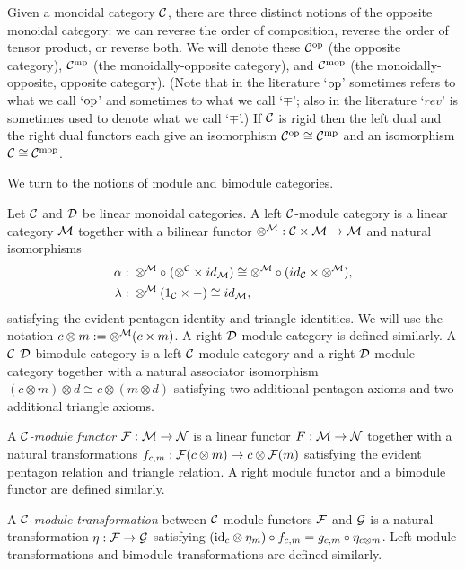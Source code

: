 \documentclass{amsart}
\begin{document}
Given a monoidal category $\mathcal C$, there are three distinct notions of the opposite monoidal category: we can reverse the order of composition, reverse the order of tensor product, or reverse both.  We will denote these $\mathcal C^{\mathrm{op}}$ (the opposite category), $\mathcal C^{\mathrm{mp}}$ (the monoidally-opposite category), and $\mathcal C^{\mathrm{mop}}$ (the monoidally-opposite, opposite category).  (Note that in the literature `$\mathrm{op}$' sometimes refers to what we call `$\mathrm{op}$' and sometimes to what we call `$\mp$'; also in the literature `$rev$' is sometimes used to denote what we call `$\mp$'.)  If $\mathcal C$ is rigid then the left dual and the right dual functors each give an isomorphism $\mathcal C^{\mathrm{op}} \cong \mathcal C^{\mathrm{mp}}$ and an isomorphism $\mathcal C \cong \mathcal C^{\mathrm{mop}}$.  

We turn to the notions of module and bimodule categories.

\begin{definition}
Let $\mathcal C$ and $\mathcal D$ be linear monoidal categories.
A left $\mathcal C$-module category is a linear category $\mathcal M$ together with a bilinear functor $\otimes^{\mathcal M}: \mathcal C \times \mathcal M \to \mathcal M$ and natural isomorphisms
	\begin{align*}
		\alpha: & \;    \otimes^{\mathcal M} \circ \; (\otimes^{\mathcal C} \times id_{\mathcal M}) \cong  \otimes^{\mathcal M} \circ (id_{\mathcal C} \times \otimes^{\mathcal M}), \\
		\lambda: & \; \otimes^{\mathcal M} (1_{\mathcal C} \times -) \cong id_{\mathcal M},
	\end{align*}
	satisfying the evident pentagon identity and triangle identities.  We will use the notation $c \otimes m := \otimes^\mathcal M(c \times m)$.  A right $\mathcal D$-module category is defined similarly.
	A $\mathcal C$-$\mathcal D$ bimodule category is a left $\mathcal C$-module category and a right $\mathcal D$-module category together with a natural associator isomorphism $(c \otimes m) \otimes d \cong c \otimes (m \otimes d)$ satisfying two additional pentagon axioms and two additional triangle axioms.
\end{definition}

\begin{definition}		
A {\em $\mathcal C$-module functor} $\mathcal F:\mathcal M \to \mathcal N$ is a linear functor $F:\mathcal M \to \mathcal N$ together with a natural transformations $f_{c,m}:\mathcal F(c \otimes m) \rightarrow c \otimes \mathcal F(m)$ satisfying the evident pentagon relation and triangle relation.  A right module functor and a bimodule functor are defined similarly.
\end{definition}
\begin{definition}
	A {\em $\mathcal C$-module transformation} between $\mathcal C$-module functors $\mathcal F$ and $\mathcal G$ is a natural transformation $\eta: \mathcal F \rightarrow \mathcal G$ satisfying $(\mathrm{id}_c \otimes \eta_m) \circ f_{c,m} = g_{c,m} \circ \eta_{c \otimes m}$.  Left module transformations and bimodule transformations are defined similarly.
\end{definition} %
	
\end{document}
